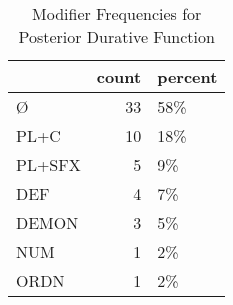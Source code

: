 \begin{table}[htbp!]
\centering
\caption{Modifier Frequencies for Posterior Durative Function}
\label{table:postdur_mod_cp}
\begin{tabular}{lrl}
\toprule
{} &  count & percent \\
\midrule
Ø      &     33 &     58\% \\
PL+C   &     10 &     18\% \\
PL+SFX &      5 &      9\% \\
DEF    &      4 &      7\% \\
DEMON  &      3 &      5\% \\
NUM    &      1 &      2\% \\
ORDN   &      1 &      2\% \\
\bottomrule
\end{tabular}
\end{table}
